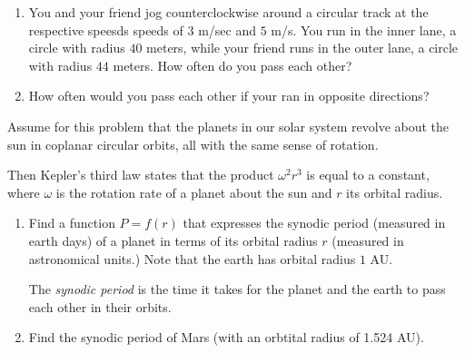 \documentclass{ximera}
\begin{document}
\begin{question} \label{QOLfdfdthnhgfg}
\begin{enumerate}
\item You and your friend jog counterclockwise around a circular track at the respective speesds speeds of $3$ m/sec and $5$ m/s. You run in the inner lane, a circle with radius $40$ meters, while your friend runs in the outer lane, a circle with radius $44$ meters. How often do you pass each other?

\item How often would you pass each other if your ran in opposite directions?

\end{enumerate}
\end{question}


\begin{question}  \label{QOFIGDIDeer3gg}
Assume for this problem that the planets in our solar system revolve about the sun in coplanar circular orbits, all with the same sense of rotation.

Then Kepler's third law states that the product $\omega^2 r^3$ is equal to a constant, where $\omega$ is the rotation rate of a planet about the sun and $r$ its orbital radius.

\begin{enumerate}
\item Find a function $P=f(r)$ that expresses the synodic period (measured in earth days) of a planet in terms of its orbital radius $r$ (measured in astronomical units.) Note that the earth has orbital radius $1$ AU.

The \emph{synodic period} is the time it takes for the planet and the earth to pass each other in their orbits.

\item Find the synodic period of Mars (with an orbtital radius of 1.524 AU).
\end{enumerate}

\end{question}
\end{document}
